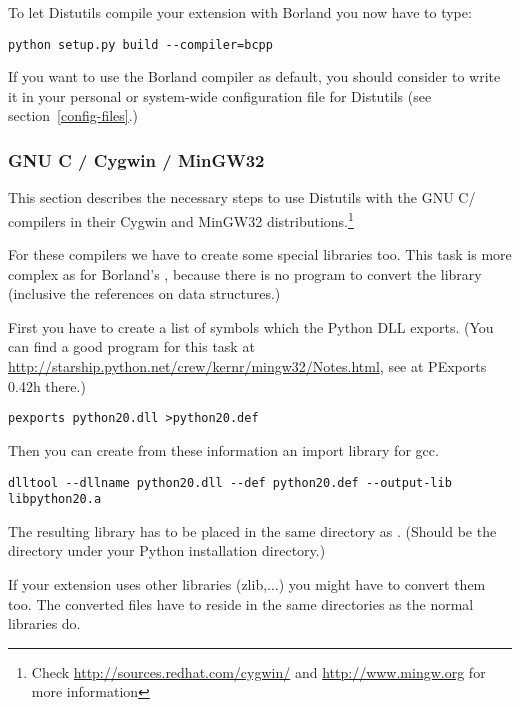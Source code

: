 \documentclass{howto}
\begin{document}
To let Distutils compile your extension with Borland \Cpp{} you now have
to type:

\begin{verbatim}
python setup.py build --compiler=bcpp
\end{verbatim}

If you want to use the Borland \Cpp{} compiler as default, you should
consider to write it in your personal or system-wide configuration
file for Distutils (see section~\ref{config-files}.)
 


\subsubsection{GNU C / Cygwin / MinGW32}

This section describes the necessary steps to use Distutils with the
GNU C/\Cpp{} compilers in their Cygwin and MinGW32
distributions.\footnote{Check
\url{http://sources.redhat.com/cygwin/} and
\url{http://www.mingw.org} for more information}


For these compilers we have to create some special libraries too.
This task is more complex as for Borland's \Cpp, because there is no
program to convert the library (inclusive the references on data
structures.)
 
First you have to create a list of symbols which the Python DLL exports.
(You can find a good program for this task at 
\url{http://starship.python.net/crew/kernr/mingw32/Notes.html}, see at 
PExports 0.42h there.)

\begin{verbatim}
pexports python20.dll >python20.def
\end{verbatim}

Then you can create from these information an import library for gcc.
 
\begin{verbatim}
dlltool --dllname python20.dll --def python20.def --output-lib libpython20.a
\end{verbatim}
The resulting library has to be placed in the same directory as 
. (Should be the  directory under your
Python installation directory.)

If your extension uses other libraries (zlib,...) you might 
have to convert them too.
The converted files have to reside in the same directories as the normal
libraries do.
\end{document}
